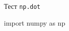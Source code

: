 \documentclass[a4paper,12pt,oneside]{extbook}
\begin{document}
Тест \verb"np.dot"

\begin{python}
import numpy as np
\end{python}
\end{document}
